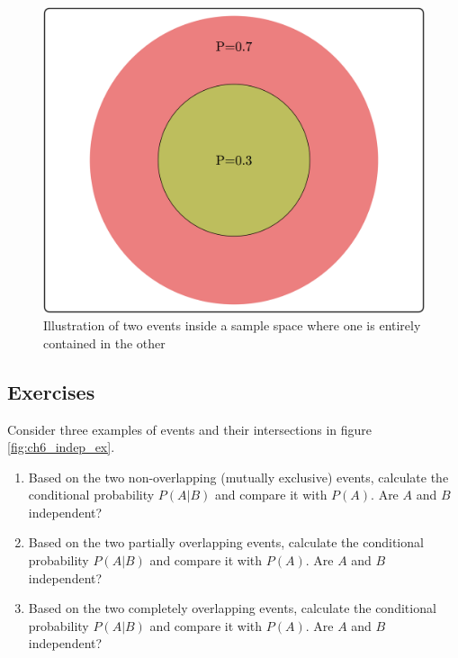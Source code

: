 \documentclass[
  letterpaper,
  DIV=11,
  numbers=noendperiod]{scrreprt}
\begin{document}
\begin{figure}

{\centering \includegraphics{./ch6/indep_ex3.png}

}

\caption{Illustration of two events inside a sample space where one is
entirely contained in the other}

\end{figure}

\hypertarget{exercises-15}{%
\subsection{Exercises}\label{exercises-15}}

Consider three examples of events and their intersections in figure
\ref{fig:ch6_indep_ex}.

\begin{enumerate}
\def\labelenumi{\arabic{enumi}.}
\item
  Based on the two non-overlapping (mutually exclusive) events,
  calculate the conditional probability \(P(A|B)\) and compare it with
  \(P(A)\). Are \(A\) and \(B\) independent?
\item
  Based on the two partially overlapping events, calculate the
  conditional probability \(P(A|B)\) and compare it with \(P(A)\). Are
  \(A\) and \(B\) independent?
\item
  Based on the two completely overlapping events, calculate the
  conditional probability \(P(A|B)\) and compare it with \(P(A)\). Are
  \(A\) and \(B\) independent?
\end{enumerate}
\end{document}
